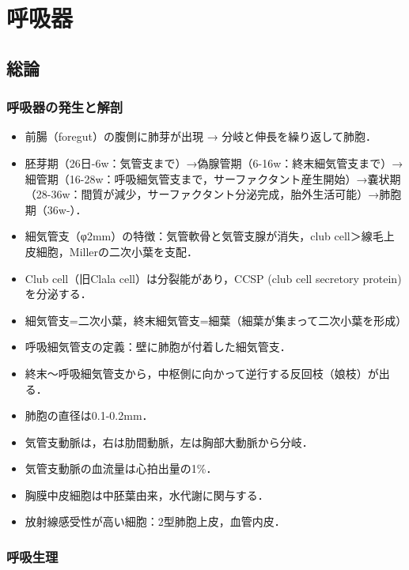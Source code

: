 

\section{呼吸器}

\subsection{総論}

\subsubsection{呼吸器の発生と解剖}

\begin{itemize}
\item 前腸（foregut）の腹側に肺芽が出現 → 分岐と伸長を繰り返して肺胞．
\item 胚芽期（26日-6w：気管支まで）→偽腺管期（6-16w：終末細気管支まで）→細管期（16-28w：呼吸細気管支まで，サーファクタント産生開始）→嚢状期（28-36w：間質が減少，サーファクタント分泌完成，胎外生活可能）→肺胞期（36w-）．
\item 細気管支（φ2mm）の特徴：気管軟骨と気管支腺が消失，club cell＞線毛上皮細胞，Millerの二次小葉を支配．
\item Club cell（旧Clala cell）は分裂能があり，CCSP (club cell secretory protein)を分泌する．
\item 細気管支=二次小葉，終末細気管支=細葉（細葉が集まって二次小葉を形成）
\item 呼吸細気管支の定義：壁に肺胞が付着した細気管支．
\item 終末〜呼吸細気管支から，中枢側に向かって逆行する反回枝（娘枝）が出る．
\item 肺胞の直径は0.1-0.2mm．
\item 気管支動脈は，右は肋間動脈，左は胸部大動脈から分岐．
\item 気管支動脈の血流量は心拍出量の1\%．
\item 胸膜中皮細胞は中胚葉由来，水代謝に関与する．
\item 放射線感受性が高い細胞：2型肺胞上皮，血管内皮．
\end{itemize}


\subsubsection{呼吸生理}

